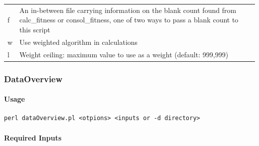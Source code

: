 \documentclass[11pt,]{article}
\let\oldparagraph\paragraph
\renewcommand{\paragraph}[1]{\oldparagraph{#1}\mbox{}}
\begin{document}
\begin{longtable}[]{@{}ll@{}}
\begin{minipage}[t]{0.06\columnwidth}
f\strut
\end{minipage} & \begin{minipage}[t]{0.88\columnwidth}\raggedright\strut
An in-between file carrying information on the blank count found from
calc\_fitness or consol\_fitness, one of two ways to pass a blank count
to this script\strut
\end{minipage}\tabularnewline
\begin{minipage}[t]{0.06\columnwidth}\raggedright\strut
w\strut
\end{minipage} & \begin{minipage}[t]{0.88\columnwidth}\raggedright\strut
Use weighted algorithm in calculations\strut
\end{minipage}\tabularnewline
\begin{minipage}[t]{0.06\columnwidth}\raggedright\strut
l\strut
\end{minipage} & \begin{minipage}[t]{0.88\columnwidth}\raggedright\strut
Weight ceiling: maximum value to use as a weight (default:
999,999)\strut
\end{minipage}\tabularnewline
\bottomrule
\end{longtable}

\subsubsection{DataOverview}\label{dataoverview}

\paragraph{Usage}\label{usage-2}

\begin{verbatim}
perl dataOverview.pl <otpions> <inputs or -d directory>
\end{verbatim}

\paragraph{Required Inputs}\label{required-inputs-2}
\end{document}
